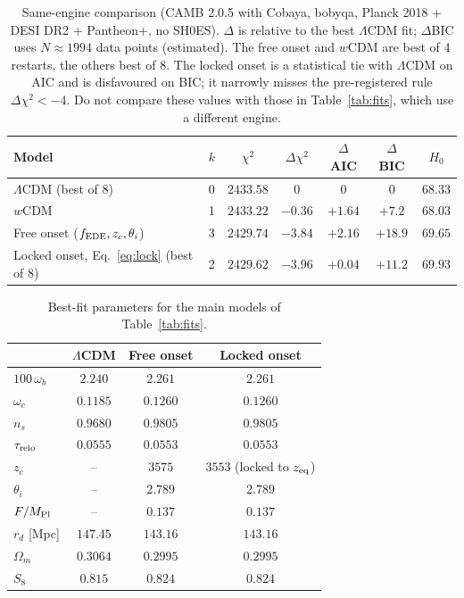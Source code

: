 \documentclass[11pt]{article}
\newcommand{\Mp}{M_{\rm Pl}}
\begin{document}
\begin{table}[h]
\centering
\small
\begin{tabular}{lcccccc}
\toprule
Model & $k$ & $\chi^2$ & $\Delta\chi^2$ & $\Delta$AIC & $\Delta$BIC & $H_0$\\
\midrule
$\Lambda$CDM (best of 8) & 0 & $2433.58$ & $0$ & $0$ & $0$ & $68.33$\\
$w$CDM & 1 & $2433.22$ & $-0.36$ & $+1.64$ & $+7.2$ & $68.03$\\
Free onset ($f_{\rm EDE},z_c,\theta_i$) & 3 & $2429.74$ & $-3.84$ & $+2.16$ & $+18.9$ & $69.65$\\
Locked onset, Eq.~\eqref{eq:lock} (best of 8) & 2 & $2429.62$ & $-3.96$ & $+0.04$ & $+11.2$ & $69.93$\\
\bottomrule
\end{tabular}
\caption{Same-engine comparison (CAMB 2.0.5 with Cobaya, bobyqa, Planck 2018 + DESI DR2 +
Pantheon+, no SH0ES). $\Delta$ is relative to the best $\Lambda$CDM fit; $\Delta$BIC uses
$N\approx1994$ data points (estimated). The free onset and $w$CDM are best of 4 restarts,
the others best of 8. The locked onset is a statistical tie with $\Lambda$CDM on AIC and
is disfavoured on BIC; it narrowly misses the pre-registered rule $\Delta\chi^2<-4$.
Do not compare these values with those in Table~\ref{tab:fits}, which use a different engine.}
\label{tab:camb}
\end{table}

\begin{table}[h]
\centering
\small
\begin{tabular}{lccc}
\toprule
& $\Lambda$CDM & Free onset & Locked onset\\
\midrule
$100\,\omega_b$ & $2.240$ & $2.261$ & $2.261$\\
$\omega_c$ & $0.1185$ & $0.1260$ & $0.1260$\\
$n_s$ & $0.9680$ & $0.9805$ & $0.9805$\\
$\tau_{\rm reio}$ & $0.0555$ & $0.0553$ & $0.0553$\\
$z_c$ & -- & $3575$ & $3553$ (locked to $z_{\rm eq}$)\\
$\theta_i$ & -- & $2.789$ & $2.789$\\
$F/\Mp$ & -- & $0.137$ & $0.137$\\
$r_d$ [Mpc] & $147.45$ & $143.16$ & $143.16$\\
$\Omega_m$ & $0.3064$ & $0.2995$ & $0.2995$\\
$S_8$ & $0.815$ & $0.824$ & $0.824$\\
\bottomrule
\end{tabular}
\caption{Best-fit parameters for the main models of Table~\ref{tab:fits}.}
\label{tab:params}
\end{table}
\end{document}
